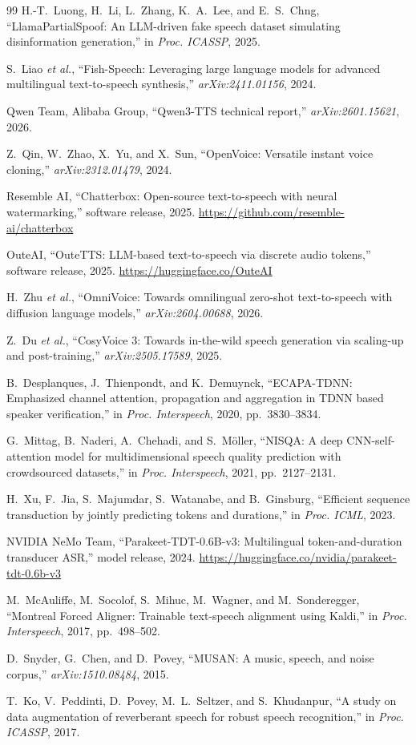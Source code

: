 \documentclass[11pt]{article}
\begin{document}
\begin{thebibliography}{99}
H.-T.~Luong, H.~Li, L.~Zhang, K.~A.~Lee, and E.~S.~Chng,
``LlamaPartialSpoof: An LLM-driven fake speech dataset simulating
disinformation generation,'' in \emph{Proc. ICASSP}, 2025.

S.~Liao \emph{et al.},
``Fish-Speech: Leveraging large language models for advanced
multilingual text-to-speech synthesis,'' \emph{arXiv:2411.01156}, 2024.

Qwen Team, Alibaba Group,
``Qwen3-TTS technical report,'' \emph{arXiv:2601.15621}, 2026.

Z.~Qin, W.~Zhao, X.~Yu, and X.~Sun,
``OpenVoice: Versatile instant voice cloning,''
\emph{arXiv:2312.01479}, 2024.

Resemble AI,
``Chatterbox: Open-source text-to-speech with neural watermarking,''
software release, 2025.
\url{https://github.com/resemble-ai/chatterbox}

OuteAI,
``OuteTTS: LLM-based text-to-speech via discrete audio tokens,''
software release, 2025. \url{https://huggingface.co/OuteAI}

H.~Zhu \emph{et al.},
``OmniVoice: Towards omnilingual zero-shot text-to-speech with diffusion
language models,'' \emph{arXiv:2604.00688}, 2026.

Z.~Du \emph{et al.},
``CosyVoice 3: Towards in-the-wild speech generation via scaling-up and
post-training,'' \emph{arXiv:2505.17589}, 2025.

B.~Desplanques, J.~Thienpondt, and K.~Demuynck,
``ECAPA-TDNN: Emphasized channel attention, propagation and aggregation
in TDNN based speaker verification,''
in \emph{Proc. Interspeech}, 2020, pp.~3830--3834.

G.~Mittag, B.~Naderi, A.~Chehadi, and S.~M\"oller,
``NISQA: A deep CNN-self-attention model for multidimensional speech
quality prediction with crowdsourced datasets,''
in \emph{Proc. Interspeech}, 2021, pp.~2127--2131.

H.~Xu, F.~Jia, S.~Majumdar, S.~Watanabe, and B.~Ginsburg,
``Efficient sequence transduction by jointly predicting tokens and
durations,'' in \emph{Proc. ICML}, 2023.

NVIDIA NeMo Team,
``Parakeet-TDT-0.6B-v3: Multilingual token-and-duration transducer ASR,''
model release, 2024.
\url{https://huggingface.co/nvidia/parakeet-tdt-0.6b-v3}

M.~McAuliffe, M.~Socolof, S.~Mihuc, M.~Wagner, and M.~Sonderegger,
``Montreal Forced Aligner: Trainable text-speech alignment using Kaldi,''
in \emph{Proc. Interspeech}, 2017, pp.~498--502.

D.~Snyder, G.~Chen, and D.~Povey,
``MUSAN: A music, speech, and noise corpus,''
\emph{arXiv:1510.08484}, 2015.

T.~Ko, V.~Peddinti, D.~Povey, M.~L.~Seltzer, and S.~Khudanpur,
``A study on data augmentation of reverberant speech for robust speech
recognition,'' in \emph{Proc. ICASSP}, 2017.

\end{thebibliography}
\end{document}
